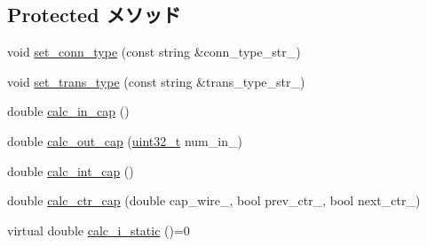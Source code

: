 \subsection*{Protected メソッド}
\begin{DoxyCompactItemize}
\item 
void \hyperlink{classCrossbar_a877bc55ee39e47325652ddafcc1234ca}{set\_\-conn\_\-type} (const string \&conn\_\-type\_\-str\_\-)
\item 
void \hyperlink{classCrossbar_a9a281542cf2d88f7728b825e0aa5a926}{set\_\-trans\_\-type} (const string \&trans\_\-type\_\-str\_\-)
\item 
double \hyperlink{classCrossbar_adfc6e5cdc14b2a1d188bc0be47291f51}{calc\_\-in\_\-cap} ()
\item 
double \hyperlink{classCrossbar_a8dc00f1f67a20a1afb6dc4147044c9eb}{calc\_\-out\_\-cap} (\hyperlink{Type_8hh_a435d1572bf3f880d55459d9805097f62}{uint32\_\-t} num\_\-in\_\-)
\item 
double \hyperlink{classCrossbar_a16e2ab6e99c8b2e72fb306b6d6094699}{calc\_\-int\_\-cap} ()
\item 
double \hyperlink{classCrossbar_ace433381d49ba5c6e19fd0e11a207b29}{calc\_\-ctr\_\-cap} (double cap\_\-wire\_\-, bool prev\_\-ctr\_\-, bool next\_\-ctr\_\-)
\item 
virtual double \hyperlink{classCrossbar_a231bfef1332fc2583c9120c237648492}{calc\_\-i\_\-static} ()=0
\end{DoxyCompactItemize}
